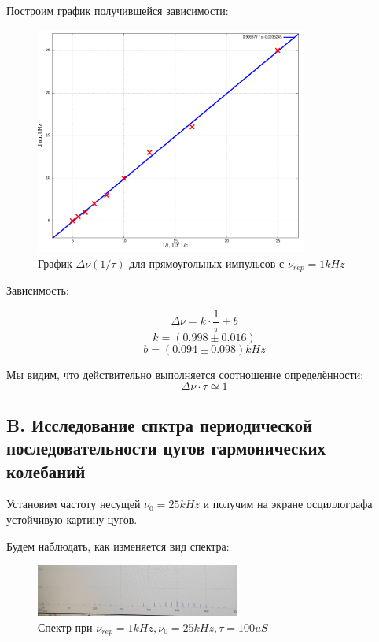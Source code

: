 \documentclass{article}
\begin{document}
Построим график получившейся зависимости:
\begin{figure}[H]
    \centering
    \includegraphics[width=0.8\textwidth]{dnu_tau.png}
    \caption{График \( \Delta\nu(1/\tau) \) для прямоугольных импульсов с \( \nu_{rep} = 1kHz \)}
    \label{pic_dnu_tau}
\end{figure}
Зависимость:

    \[ \Delta\nu = k \cdot \frac{1}{\tau} + b \]
    \[ k = (0.998 \pm 0.016) \]
    \[ b = (0.094 \pm 0.098) kHz\]

Мы видим, что действительно выполняется соотношение определённости:
\[ \Delta\nu\cdot\tau \simeq 1 \]

\subsection{B. Исследование спктра периодической последовательности цугов гармонических колебаний}

Установим частоту несущей \( \nu_0 = 25kHz \) и получим на экране осциллографа устойчивую картину цугов.

Будем наблюдать, как изменяется вид спектра:

\begin{figure}[H]
    \centering
    \includegraphics[width=0.6\textwidth]{cug_1.jpg}
    \caption{Спектр при \( \nu_{rep} = 1kHz, \nu_0 = 25 kHz, \tau = 100uS \)}
    \label{spec_cug_1}
\end{figure}
\end{document}
